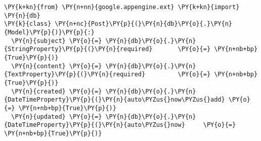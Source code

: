 \begin{Verbatim}[commandchars=\\\{\}]
\PY{k+kn}{from} \PY{n+nn}{google.appengine.ext} \PY{k+kn}{import} \PY{n}{db}
\PY{k}{class} \PY{n+nc}{Post}\PY{p}{(}\PY{n}{db}\PY{o}{.}\PY{n}{Model}\PY{p}{)}\PY{p}{:}
  \PY{n}{subject} \PY{o}{=} \PY{n}{db}\PY{o}{.}\PY{n}{StringProperty}\PY{p}{(}\PY{n}{required}       \PY{o}{=} \PY{n+nb+bp}{True}\PY{p}{)}
  \PY{n}{content} \PY{o}{=} \PY{n}{db}\PY{o}{.}\PY{n}{TextProperty}\PY{p}{(}\PY{n}{required}         \PY{o}{=} \PY{n+nb+bp}{True}\PY{p}{)}
  \PY{n}{created} \PY{o}{=} \PY{n}{db}\PY{o}{.}\PY{n}{DateTimeProperty}\PY{p}{(}\PY{n}{auto\PYZus{}now\PYZus{}add} \PY{o}{=} \PY{n+nb+bp}{True}\PY{p}{)}
  \PY{n}{updated} \PY{o}{=} \PY{n}{db}\PY{o}{.}\PY{n}{DateTimeProperty}\PY{p}{(}\PY{n}{auto\PYZus{}now}     \PY{o}{=} \PY{n+nb+bp}{True}\PY{p}{)}
\end{Verbatim}
